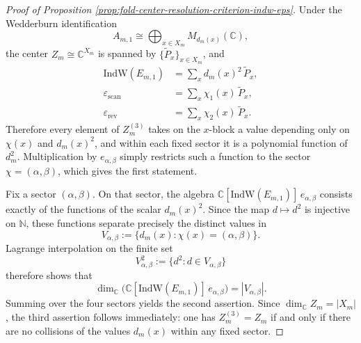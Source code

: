 \documentclass[12pt,a4paper]{article}
\theoremstyle{plain}
\theoremstyle{definition}
\numberwithin{equation}{section}
\newcommand{\CC}{\mathbb{C}}
\newcommand{\NN}{\mathbb{N}}
\begin{document}
\begin{proof}[Proof of Proposition \ref{prop:fold-center-resolution-criterion-indw-eps}]
Under the Wedderburn identification\[A_{m,1}\cong\bigoplus_{x\in X_m}M_{d_m(x)}(\CC),\]the center \(Z_m\cong\CC^{X_m}\) is spanned by \(\{\widetilde P_x\}_{x\in X_m}\), and
\[
\begin{aligned}
\mathrm{IndW}(E_{m,1})&=\sum_x d_m(x)^2\,\widetilde P_x,\\
\varepsilon_{\mathrm{scan}}&=\sum_x \chi_1(x)\,\widetilde P_x,\\
\varepsilon_{\mathrm{rev}}&=\sum_x \chi_2(x)\,\widetilde P_x.
\end{aligned}
\]
Therefore every element of \(Z_m^{(3)}\) takes on the \(x\)-block a value depending only on \(\chi(x)\) and \(d_m(x)^2\), and within each fixed sector it is a polynomial function of \(d_m^2\). Multiplication by \(e_{\alpha,\beta}\) simply restricts such a function to the sector \(\chi=(\alpha,\beta)\), which gives the first statement.

Fix a sector \((\alpha,\beta)\). On that sector, the algebra \(\CC[\mathrm{IndW}(E_{m,1})]\,e_{\alpha,\beta}\) consists exactly of the functions of the scalar \(d_m(x)^2\). Since the map \(d\mapsto d^2\) is injective on \(\NN\), these functions separate precisely the distinct values in
\[
V_{\alpha,\beta}:=\{d_m(x):\chi(x)=(\alpha,\beta)\}.
\]
Lagrange interpolation on the finite set
\[
V_{\alpha,\beta}^2:=\{d^2:d\in V_{\alpha,\beta}\}
\]
therefore shows that
\[
\dim_{\CC}\bigl(\CC[\mathrm{IndW}(E_{m,1})]\,e_{\alpha,\beta}\bigr)=|V_{\alpha,\beta}|.
\]
Summing over the four sectors yields the second assertion. Since \(\dim_{\CC}Z_m=|X_m|\), the third assertion follows immediately: one has \(Z_m^{(3)}=Z_m\) if and only if there are no collisions of the values \(d_m(x)\) within any fixed sector.
\end{proof}
\end{document}
